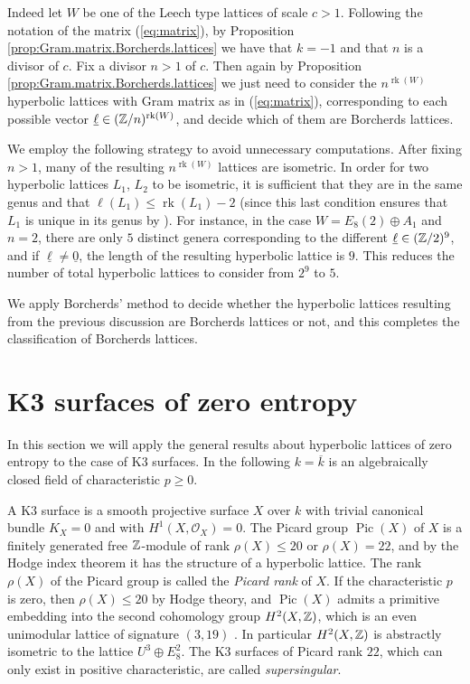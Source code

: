 \documentclass[11pt,letterpaper]{amsart}
\DeclareMathOperator{\rk}{rk}
\DeclareMathOperator{\Pic}{Pic}
\begin{document}
Indeed let $W$ be one of the Leech type lattices of scale $c>1$. Following the notation of the matrix (\ref{eq:matrix}), by Proposition \ref{prop:Gram.matrix.Borcherds.lattices} we have that $k=-1$ and that $n$ is a divisor of $c$. Fix a divisor $n>1$ of $c$. Then again by Proposition \ref{prop:Gram.matrix.Borcherds.lattices} we just need to consider the $n^{\rk(W)}$ hyperbolic lattices with Gram matrix as in (\ref{eq:matrix}), corresponding to each possible vector $\underline{\ell}\in (\ZZ/n)^{\rk(W)}$, and decide which of them are Borcherds lattices.

We employ the following strategy to avoid unnecessary computations. After fixing $n>1$, many of the resulting $n^{\rk(W)}$ lattices are isometric. In order for two hyperbolic lattices $L_1$, $L_2$ to be isometric, it is sufficient that they are in the same genus and that $\ell(L_1)\le \rk(L_1)-2$ (since this last condition ensures that $L_1$ is unique in its genus by \cite[Corollary~1.13.3]{nikulin.integral.symmetric.bilinear}). For instance, in the case $W=E_8(2)\oplus A_1$ and $n=2$, there are only $5$ distinct genera corresponding to the different $\underline{\ell}\in (\mathbb{Z}/2)^{9}$, and if $\underline{\ell}\ne \underline{0}$, the length of the resulting hyperbolic lattice is $9$. This reduces the number of total hyperbolic lattices to consider from $2^9$ to $5$.

We apply Borcherds' method to decide whether the hyperbolic lattices resulting from the previous discussion are Borcherds lattices or not, and this completes the classification of Borcherds lattices.

\section{K3 surfaces of zero entropy} \label{sec:K3}

In this section we will apply the general results about hyperbolic lattices of zero entropy to the case of K3 surfaces. In the following $k=\overline{k}$ is an algebraically closed field of characteristic $p\ge 0$. 

A K3 surface is a smooth projective surface $X$ over $k$ with trivial canonical bundle $K_X=0$ and with $H^1(X,\mathcal{O}_X)=0$. The Picard group $\Pic(X)$ of $X$ is a finitely generated free $\mathbb{Z}$-module of rank $\rho(X)\le 20$ or $\rho(X)=22$, and by the Hodge index theorem it has the structure of a hyperbolic lattice. The rank $\rho(X)$ of the Picard group is called the \emph{Picard rank} of $X$. If the characteristic $p$ is zero, then $\rho(X)\le 20$ by Hodge theory, and $\Pic(X)$ admits a primitive embedding into the second cohomology group $H^2(X,\mathbb{Z})$, which is an even unimodular lattice of signature $(3,19)$ \cite[Proposition~1.3.5]{huybrechts.K3}. In particular $H^2(X,\mathbb{Z})$ is abstractly isometric to the lattice $U^3\oplus E_8^2$.
The K3 surfaces of Picard rank $22$, which can only exist in positive characteristic, are called \emph{supersingular}. 
\end{document}
